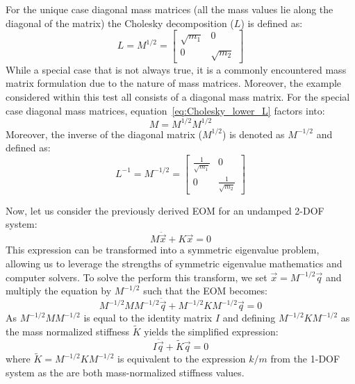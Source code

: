 \documentclass[12pt,letter]{article}
\begin{document}
		For the unique case diagonal mass matrices (all the mass values lie along the diagonal of the matrix) the Cholesky decomposition ($L$) is defined as:
		\begin{equation}
			L = M^{1/2} = \begin{bmatrix} \sqrt{m_1} & 0 \\  0  & \sqrt{m_2} \end{bmatrix} 
			\label{eq:Cholesky_lower_L}
		\end{equation}
		While a special case that is not always true, it is a commonly encountered mass matrix formulation due to the nature of mass matrices. Moreover, the example considered within this test all consists of a diagonal mass matrix. For the special case  diagonal mass matrices, equation~\ref{eq:Cholesky_lower_L} factors into:
		\begin{equation}
			M = M^{1/2}M^{1/2}
		\end{equation}
		Moreover, the inverse of the diagonal matrix ($M^{1/2}$) is denoted as $M^{-1/2}$ and defined as:
		\begin{equation}
			L^{-1} = M^{-1/2} = \begin{bmatrix} \frac{1}{\sqrt{m_1}} & 0 \\  0  & \frac{1}{\sqrt{m_2}} \end{bmatrix} 
		\end{equation}	
	
	
	Now, let us consider the previously derived EOM for an undamped 2-DOF system:
	\begin{equation}
	M\ddot{\vec{x}} + K\vec{x} =0
	\end{equation}
	This expression can be transformed into a symmetric eigenvalue problem, allowing us to leverage the strengths of symmetric eigenvalue mathematics and computer solvers. To solve the perform this transform, we set $\vec{x}=M^{-1/2}\vec{q}$ and multiply the equation by $M^{-1/2}$ such that the EOM becomes:
	\begin{equation}
	M^{-1/2}MM^{-1/2}\ddot{\vec{q}} + M^{-1/2}KM^{-1/2}\vec{q} =0
	\end{equation}
	As $M^{-1/2}MM^{-1/2}$ is equal to the identity matrix $I$ and defining $M^{-1/2}KM^{-1/2}$ as the mass normalized stiffness $\widetilde{K}$ yields the simplified expression:
	\begin{equation}
	I\ddot{\vec{q}} + \widetilde{K}\vec{q} =0
	\end{equation}
	where $\widetilde{K}=M^{-1/2}KM^{-1/2}$ is equivalent to the expression $k/m$ from the 1-DOF system as the are both mass-normalized stiffness values. 
	
\end{document}
